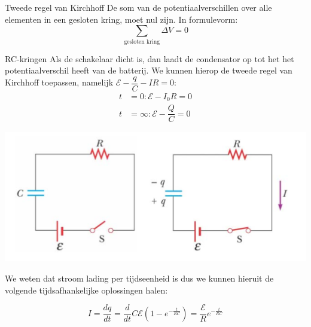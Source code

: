 \begin{theo}{Tweede regel van Kirchhoff}
    De som van de potentiaalverschillen over alle elementen in een gesloten kring, moet nul zijn. In formulevorm:
    \begin{equation*}
        \sum_{\text{gesloten kring}} \Delta V = 0
    \end{equation*}
    \vspace{-0.4cm}
\end{theo}

\newpage

\begin{app}[RC-kringen]{RC-kringen}
    Als de schakelaar dicht is, dan laadt de condensator op tot het het potentiaalverschil heeft van de batterij.
    We kunnen hierop de tweede regel van Kirchhoff toepassen, namelijk $\mathcal{E} - \dfrac{q}{C} - IR = 0$:
    \begin{align*}
        t &= 0: \mathcal{E} - I_0R = 0 \\ 
        t &= \infty: \mathcal{E} - \dfrac{Q}{C} = 0
    \end{align*}
    \begin{center}
        \includegraphics[scale = 0.3]{Images/Elektriciteit/RC-kring.png}
    \end{center}
    We weten dat stroom lading per tijdseenheid is dus we kunnen hieruit de volgende tijdsafhankelijke oplossingen halen:

    \begin{equation*}
         I = \dfrac{dq}{dt} = \dfrac{d}{dt} C\mathcal{E}(1-e^{-\tfrac{t}{RC}}) = \dfrac{\mathcal{E}}{R}e^{-\tfrac{t}{RC}}
    \end{equation*}
    

\end{app}
